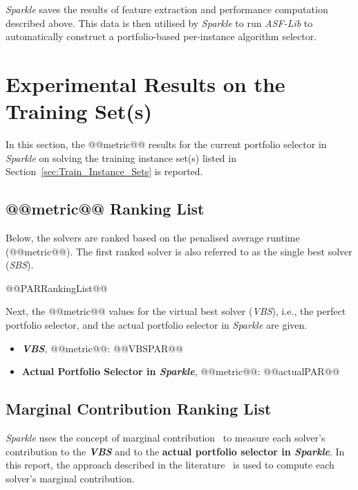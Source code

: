 \documentclass[british]{article}
\begin{document}
\emph{Sparkle} saves the results of feature extraction and performance computation described above. This data is then utilised by \emph{Sparkle} to run \emph{ASF-Lib} to automatically construct a portfolio-based per-instance algorithm selector.

\section{Experimental Results on the Training Set(s)}
\label{sec:Experimental_Results_Train}

In this section, the @@metric@@ results for the current portfolio selector in \emph{Sparkle} on solving the training instance set(s) listed in Section~\ref{sec:Train_Instance_Sets} is reported.

\subsection{@@metric@@ Ranking List}
\label{sec:PAR_Ranking}

Below, the solvers are ranked based on the penalised average runtime (@@metric@@). The first ranked solver is also referred to as the single best solver (\emph{SBS}).

\begin{enumerate}
@@PARRankingList@@
\end{enumerate}

Next, the @@metric@@ values for the virtual best solver (\emph{VBS}), i.e., the perfect portfolio selector, and the actual portfolio selector in \emph{Sparkle} are given.

\begin{itemize}
\item \textbf{\emph{VBS}}, @@metric@@: @@VBSPAR@@
\item \textbf{Actual Portfolio Selector in \emph{Sparkle}}, @@metric@@: @@actualPAR@@
\end{itemize}

\subsection{Marginal Contribution Ranking List}
\label{sec:Marginal_Contribution_Ranking}

\emph{Sparkle} uses the concept of marginal contribution~\cite{XuEtAl12} to measure each solver's contribution to the \textbf{\emph{VBS}} and to the \textbf{actual portfolio selector in \emph{Sparkle}}. In this report, the approach described in the literature~\cite{FreEtAl16} is used to compute each solver's marginal contribution.
\end{document}
